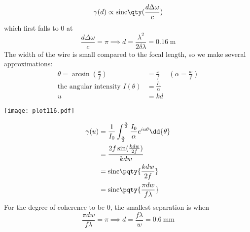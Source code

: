 \documentclass[12pt]{extarticle}
\begin{document}
\begin{outline}[enumerate]
\[            \gamma(d)\propto \mathrm{sinc}\qty(\frac{d \Delta \omega}{c})
        \]
        which first falls to \(0\) at \[
            \frac{d\Delta\omega}{c} = \pi \implies d = \frac{\lambda^2}{2\delta \lambda} = 0.16\;\mathrm{m}
        \] 
        \1
        The width of the wire is small compared to the focal length, so we make several approximations:\begin{align*}
            \theta =  \arcsin(\frac{x}{f}) &=  \frac{x}{f} & (\alpha = \frac{w}{f})\\
            \text{the angular intensity } I(\theta) &= \frac{I_0}{\alpha}\\
            u &= kd
        \end{align*}
        \begin{center}
            \texttt{[image: plot116.pdf]}
        \end{center}
        \begin{align*}
            \gamma(u) &=   \frac{1}{I_0}\int_{\frac{\alpha}{2}}^{\frac{\alpha}{2}}\frac{I_0}{\alpha}e^{iu\theta}\dd{\theta}\\
            &= \frac{2f\sin(\frac{kdw}{2f})}{kdw}\\
            &= \mathrm{sinc}\pqty{\frac{kdw}{2f} }\\
            &= \mathrm{sinc}\pqty{\frac{\pi dw}{f\lambda} }
        \end{align*}
        For the degree of coherence to be \(0\), the smallest separation is when \[
            \frac{\pi dw}{f\lambda} = \pi \implies d = \frac{f\lambda}{w} = 0.6 \:\mathrm{mm}
        \]
    \end{outline}
\end{document}
